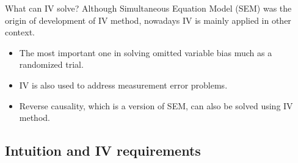 \documentclass{beamer}
\begin{document}
\begin{frame}{What can IV solve?}
Although Simultaneous Equation Model (SEM) was the origin of development of IV method, nowadays IV is mainly applied in other context.\bigskip
\begin{itemize}
\item The most important one in solving omitted variable bias much as a randomized trial.
\item IV is also used to address measurement error problems.
\item Reverse causality, which is a version of SEM, can also be solved using IV method.
\end{itemize}
\end{frame}

\subsection{Intuition and IV requirements}
\end{document}
